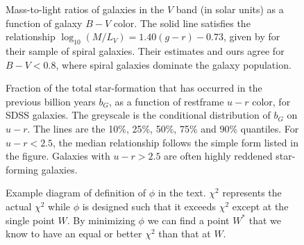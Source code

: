 \documentclass[10pt,preprint]{aastex}
\newcounter{thefigs}
\newcommand{\fignum}{\arabic{thefigs}}
\begin{document}
\clearpage
{}
\begin{figure}
\figurenum{\fignum}
\caption{\label{mtol} Mass-to-light ratios of galaxies in the $V$ band
	(in solar units) as a function of galaxy $B-V$ color. The solid line
	satisfies the relationship $\log_{10}(M/L_V) = 1.40 (g-r) - 0.73$,
	given by \citet{bell01b} for their sample of spiral galaxies. 
	Their estimates and ours agree for $B-V < 0.8$, where spiral
	galaxies dominate the galaxy population.}
\end{figure}

\clearpage
{}
\begin{figure}
\figurenum{\fignum}
\caption{\label{umr_bg} Fraction of the total star-formation that has
	occurred in the previous billion years $b_G$, as a function of restframe
	$u-r$ color, for SDSS galaxies. The greyscale is the conditional
	distribution of $b_G$ on $u-r$. The lines are the 10\%, 25\%, 50\%,
	75\% and 90\% quantiles. For $u-r < 2.5$, the median relationship
	follows the simple form listed in the figure. Galaxies with $u-r >
	2.5$ are often highly reddened star-forming galaxies.}
\end{figure}

\clearpage
{}
\begin{figure}
\figurenum{\fignum}
\caption{\label{lemma} Example diagram of definition of $\phi$ in the
	text. $\chi^2$ represents the actual $\chi^2$ while $\phi$ is
	designed such that it exceeds $\chi^2$ except at the single point
	$W$. By minimizing $\phi$ we can find a point $W^\ast$ that we know
	to have an equal or better $\chi^2$ than that at $W$. }
\end{figure}
\end{document}
